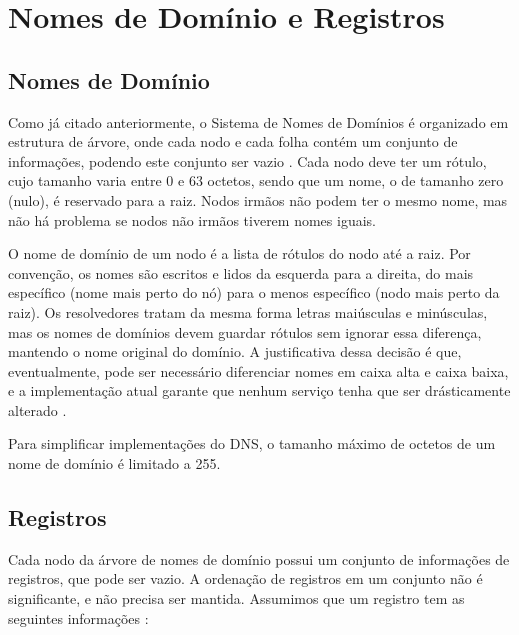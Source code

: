 \section{Nomes de Domínio e Registros}

\subsection{Nomes de Domínio}
Como já citado anteriormente, o Sistema de Nomes de Domínios é
organizado em estrutura de árvore, onde cada nodo e cada folha contém um
conjunto de informações, podendo este conjunto ser vazio
\cite{rfc1034}. Cada nodo deve ter um rótulo, cujo tamanho varia entre 0
e 63 octetos, sendo que um nome, o de tamanho zero (nulo), é reservado
para a raiz. Nodos irmãos não podem ter o mesmo nome, mas não há
problema se nodos não irmãos tiverem nomes iguais.

O nome de domínio de um nodo é a lista de rótulos do nodo até a
raiz. Por convenção, os nomes são escritos e lidos da esquerda para a
direita, do mais específico (nome mais perto do nó) para o menos
específico (nodo mais perto da raiz). Os resolvedores tratam da mesma
forma letras maiúsculas e minúsculas, mas os nomes de domínios devem
guardar rótulos sem ignorar essa diferença, mantendo o nome original do
domínio. A justificativa dessa decisão é que, eventualmente, pode ser
necessário diferenciar nomes em caixa alta e caixa baixa, e a
implementação atual garante que nenhum serviço tenha que ser
drásticamente alterado \cite{rfc1034}.

Para simplificar implementações do DNS, o tamanho máximo de octetos de
um nome de domínio é limitado a 255.

\subsection{Registros}

Cada nodo da árvore de nomes de domínio possui um conjunto de
informações de registros, que pode ser vazio. A ordenação de registros
em um conjunto não é significante, e não precisa ser mantida. Assumimos
que um registro tem as seguintes informações \cite{comer}:

